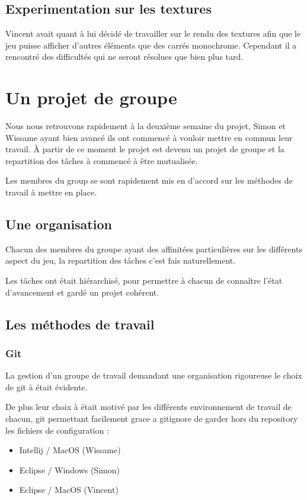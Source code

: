 \documentclass[french,12pt]{article}
\newcommand{\ml}[0]{\par\noindent}
\begin{document}
\subsection{Experimentation sur les textures}

Vincent avait quant à lui décidé de travailler sur le rendu des textures afin que le jeu puisse afficher d'autres éléments que des carrés monochrome. Cependant il a rencontré des difficultés qui ne seront résolues que bien plus tard.

\section{Un projet de groupe}

Nous nous retrouvons rapidement à la deuxième semaine du projet, Simon et Wissame ayant bien avancé ils ont commencé à vouloir mettre en commun leur travail. À partir de ce moment le projet est devenu un projet de groupe et la repartition des tâches à commencé à être mutualisée. 
\ml
Les membres du group se sont rapidement mis en d'accord sur les méthodes de travail à mettre en place.

\subsection{Une organisation}

Chacun des membres du groupe ayant des affinitées particulières sur les différents aspect du jeu, la repartition des tâches c'est fais naturellement.
\ml
Les tâches ont était hiérarchisé, pour permettre à chacun de connaître l'état d'avancement et gardé un projet cohérent.

\subsection{Les méthodes de travail}

\subsubsection{Git}

La gestion d'un groupe de travail demandant une organisation rigoureuse le choix de git à était évidente. 

De plus leur choix à était motivé par les différents environnement de travail de chacun, git permettant facilement grace a gitignore de garder hors du repository les fichiers de configuration :

\begin{itemize}
\item Intellij / MacOS (Wissame)
\item Eclipse / Windows (Simon)
\item Eclipse / MacOS (Vincent)
\end{itemize}
\end{document}
